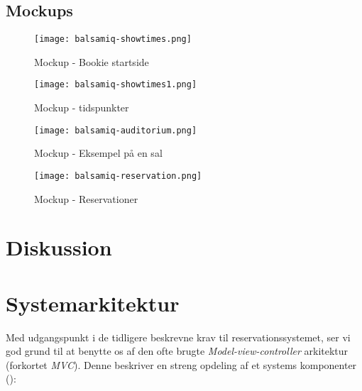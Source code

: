 \subsection{Mockups}

\begin{figure}[h]
  \centering
  \texttt{[image: balsamiq-showtimes.png]}
  \caption{Mockup - Bookie startside}
  \label{mockup: balsamiq-showtimes}
\end{figure}

\begin{figure}[h]
  \centering
  \texttt{[image: balsamiq-showtimes1.png]}
  \caption{Mockup - tidspunkter}
  \label{mockup: balsamiq-showtimes1}
\end{figure}

\begin{figure}[h]
  \centering
  \texttt{[image: balsamiq-auditorium.png]}
  \caption{Mockup - Eksempel på en sal}
  \label{mockup: balsamiq-auditorium}
\end{figure}

\begin{figure}[h]
  \centering
  \texttt{[image: balsamiq-reservation.png]}
  \caption{Mockup - Reservationer}
  \label{mockup: balsamiq-reservation}
\end{figure}

\section{Diskussion}

\section{Systemarkitektur}
\label{chapter:systemarkitektur}

Med udgangspunkt i de tidligere beskrevne krav til reservationssystemet, ser vi god grund til at benytte os af den ofte brugte \textit{Model-view-controller} arkitektur (forkortet \textit{MVC}). Denne beskriver en streng opdeling af et systems komponenter (\cite{wiki:mvc}):


